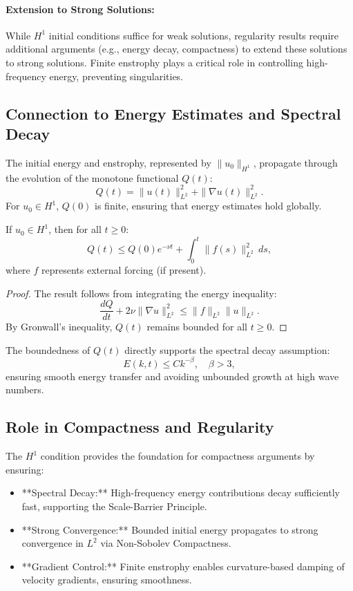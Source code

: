 \documentclass[12pt]{article}
\theoremstyle{definition}
\begin{document}
\paragraph{Extension to Strong Solutions:}
While $H^1$ initial conditions suffice for weak solutions, regularity results require additional arguments (e.g., energy decay, compactness) to extend these solutions to strong solutions. Finite enstrophy plays a critical role in controlling high-frequency energy, preventing singularities.

\subsection{Connection to Energy Estimates and Spectral Decay}
The initial energy and enstrophy, represented by $\|u_0\|_{H^1}$, propagate through the evolution of the monotone functional $Q(t)$:
\begin{equation}
Q(t) = \|u(t)\|_{L^2}^2 + \|\nabla u(t)\|_{L^2}^2.
\end{equation}
For $u_0 \in H^1$, $Q(0)$ is finite, ensuring that energy estimates hold globally.

\begin{lemma}
If $u_0 \in H^1$, then for all $t \geq 0$:
\begin{equation}
Q(t) \leq Q(0) e^{-\nu t} + \int_0^t \|f(s)\|_{L^2}^2 \, ds,
\end{equation}
where $f$ represents external forcing (if present).
\end{lemma}

\begin{proof}
The result follows from integrating the energy inequality:
\begin{equation}
\frac{dQ}{dt} + 2\nu \|\nabla u\|_{L^2}^2 \leq \|f\|_{L^2} \|u\|_{L^2}.
\end{equation}
By Gronwall’s inequality, $Q(t)$ remains bounded for all $t \geq 0$.
\end{proof}

The boundedness of $Q(t)$ directly supports the spectral decay assumption:
\begin{equation}
E(k, t) \leq C k^{-\beta}, \quad \beta > 3,
\end{equation}
ensuring smooth energy transfer and avoiding unbounded growth at high wave numbers.

\subsection{Role in Compactness and Regularity}
The $H^1$ condition provides the foundation for compactness arguments by ensuring:
\begin{itemize}
    \item **Spectral Decay:** High-frequency energy contributions decay sufficiently fast, supporting the Scale-Barrier Principle.
    \item **Strong Convergence:** Bounded initial energy propagates to strong convergence in $L^2$ via Non-Sobolev Compactness.
    \item **Gradient Control:** Finite enstrophy enables curvature-based damping of velocity gradients, ensuring smoothness.
\end{itemize}
\end{document}
